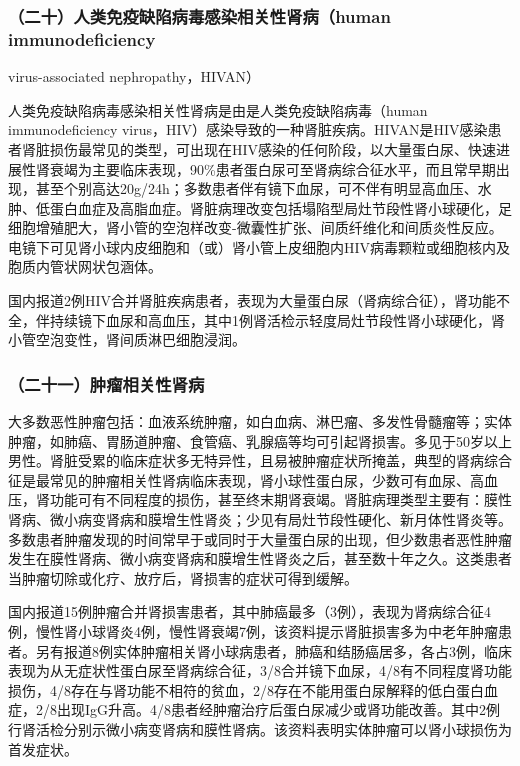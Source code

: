 \subsubsection{（二十）人类免疫缺陷病毒感染相关性肾病（human immunodeficiency}
virus-associated nephropathy，HIVAN）

人类免疫缺陷病毒感染相关性肾病是由是人类免疫缺陷病毒（human
immunodeficiency
virus，HIV）感染导致的一种肾脏疾病。HIVAN是HIV感染患者肾脏损伤最常见的类型，可出现在HIV感染的任何阶段，以大量蛋白尿、快速进展性肾衰竭为主要临床表现，90\%患者蛋白尿可至肾病综合征水平，而且常早期出现，甚至个别高达20g/24h；多数患者伴有镜下血尿，可不伴有明显高血压、水肿、低蛋白血症及高脂血症。肾脏病理改变包括塌陷型局灶节段性肾小球硬化，足细胞增殖肥大，肾小管的空泡样改变-微囊性扩张、间质纤维化和间质炎性反应。电镜下可见肾小球内皮细胞和（或）肾小管上皮细胞内HIV病毒颗粒或细胞核内及胞质内管状网状包涵体。

国内报道2例HIV合并肾脏疾病患者，表现为大量蛋白尿（肾病综合征），肾功能不全，伴持续镜下血尿和高血压，其中1例肾活检示轻度局灶节段性肾小球硬化，肾小管空泡变性，肾间质淋巴细胞浸润。

\subsubsection{（二十一）肿瘤相关性肾病}

大多数恶性肿瘤包括：血液系统肿瘤，如白血病、淋巴瘤、多发性骨髓瘤等；实体肿瘤，如肺癌、胃肠道肿瘤、食管癌、乳腺癌等均可引起肾损害。多见于50岁以上男性。肾脏受累的临床症状多无特异性，且易被肿瘤症状所掩盖，典型的肾病综合征是最常见的肿瘤相关性肾病临床表现，肾小球性蛋白尿，少数可有血尿、高血压，肾功能可有不同程度的损伤，甚至终末期肾衰竭。肾脏病理类型主要有：膜性肾病、微小病变肾病和膜增生性肾炎；少见有局灶节段性硬化、新月体性肾炎等。多数患者肿瘤发现的时间常早于或同时于大量蛋白尿的出现，但少数患者恶性肿瘤发生在膜性肾病、微小病变肾病和膜增生性肾炎之后，甚至数十年之久。这类患者当肿瘤切除或化疗、放疗后，肾损害的症状可得到缓解。

国内报道15例肿瘤合并肾损害患者，其中肺癌最多（3例），表现为肾病综合征4例，慢性肾小球肾炎4例，慢性肾衰竭7例，该资料提示肾脏损害多为中老年肿瘤患者。另有报道8例实体肿瘤相关肾小球病患者，肺癌和结肠癌居多，各占3例，临床表现为从无症状性蛋白尿至肾病综合征，3/8合并镜下血尿，4/8有不同程度肾功能损伤，4/8存在与肾功能不相符的贫血，2/8存在不能用蛋白尿解释的低白蛋白血症，2/8出现IgG升高。4/8患者经肿瘤治疗后蛋白尿减少或肾功能改善。其中2例行肾活检分别示微小病变肾病和膜性肾病。该资料表明实体肿瘤可以肾小球损伤为首发症状。

